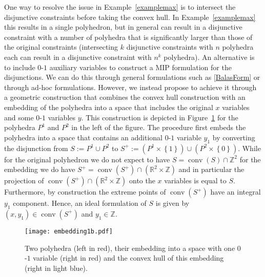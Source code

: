 \documentclass[mnsc]{informs3}
\newcommand{\set}[1]{\left\{#1\right\}}                     %
\newcommand{\bra}[1]{\left(#1\right)}
\DeclareMathOperator{\conv}{conv}
\begin{document}
One way to resolve the issue in Example~\ref{examplemax} is to intersect the disjunctive constraints before taking the convex hull. In Example~\ref{examplemax} this results in a single polyhedron, but in general can result in a disjunctive constraint with a number of polyhedra that is significantly larger than those of the original constraints (intersecting $k$ disjunctive constraints with $n$ polyhedra each can result in a disjunctive constraint with $n^k$ polyhedra). An alternative is to include $0$-$1$ auxiliary variables to construct a MIP formulation for the disjunctions. We can do this through general formulations such as \eqref{BalasForm} or through ad-hoc formulations. However, we instead propose to achieve it through a geometric construction that combines the convex hull construction with an embedding of the polyhedra into a space that includes the original $x$ variables and some $0$-$1$ variables $y$. This construction is depicted  in Figure~\ref{embeddingillust} for the polyhedra $P^1$ and $P^2$ in the left of the figure. The procedure first embeds the polyhedra into a space that contains an additional $0$-$1$ variable $y_1$ by converting the disjunction from $S:=P^1\cup P^2$ to  $S^+:=\bra{P^1\times \set{1}} \cup \bra{P^2\times \set{0}}$. While for the original polyhedron we do not expect to have $S=\conv(S)\cap \mathbb{Z}^2$ for the embedding we do  have $S^+=\conv\bra{S^+}\cap \bra{\mathbb{R}^2\times \mathbb{Z}}$ and in particular the projection of $\conv\bra{S^+}\cap \bra{\mathbb{R}^2\times \mathbb{Z}}$ onto the $x$ variables is equal to $S$. Furthermore, by construction the extreme points of $\conv\bra{S^+}$ have an integral $y_1$ component. Hence, an ideal formulation of $S$ is given by $\bra{x,y_1}\in \conv\bra{S^+}$ and $y_1\in \mathbb{Z}$. 
  \begin{figure}[htpb]
  \begin{center}
  \texttt{[image: embedding1b.pdf]}
  \end{center}
  \caption{Two polyhedra (left in red), their embedding into a space with one $0$-$1$ variable (right in red) and the convex hull of this embedding (right in light blue).}\label{embeddingillust}
  \end{figure}
\end{document}
